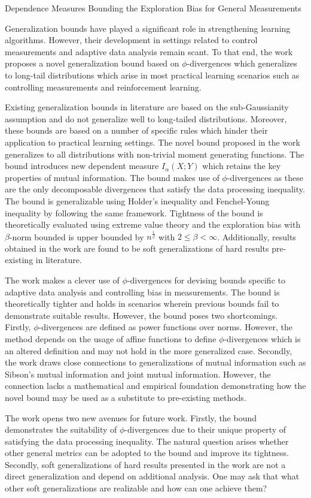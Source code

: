 \documentclass[12pt,letterpaper]{article}
\begin{document}
\begin{center}
  \large{Dependence Measures Bounding the Exploration
  Bias for General Measurements}
\end{center}

Generalization bounds have played a significant role in strengthening learning algorithms. However, their development in settings related to control measurements and adaptive data analysis remain scant. To that end, the work proposes a novel generalization bound based on $\phi$-divergences which generalizes to long-tail distributions which arise in most practical learning scenarios such as controlling measurements and reinforcement learning. 

Existing generalization bounds in literature are based on the sub-Gaussianity assumption and do not generalize well to long-tailed distributions. Moreover, these bounds are based on a number of specific rules which hinder their application to practical learning settings. The novel bound proposed in the work generalizes to all distributions with non-trivial moment generating functions. The bound introduces new dependent measure $I_{\alpha}(X;Y)$ which retains the key properties of mutual information. The bound makes use of $\phi$-divergences as these are the only decomposable divergences that satisfy the data processing inequality. The bound is generalizable using Holder's inequality and Fenchel-Young inequality by following the same framework. Tightness of the bound is theoretically evaluated using extreme value theory and the exploration bias with $\beta$-norm bounded is upper bounded by $n^{\frac{1}{\beta}}$ with $2 \leq\beta<\infty$. Additionally, results obtained in the work are found to be soft generalizations of hard results pre-existing in literature. 

The work makes a clever use of $\phi$-divergences for devising bounds specific to adaptive data analysis and controlling bias in measurements. The bound is theoretically tighter and holds in scenarios wherein previous bounds fail to demonstrate suitable results. However, the bound poses two shortcomings. Firstly, $\phi$-divergences are defined as power functions over norms. However, the method depends on the usage of affine functions to define $\phi$-divergences which is an altered definition and may not hold in the more generalized case. Secondly, the work draws close connections to generalizations of mutual information such as Sibson's mutual information and joint mutual information. However, the connection lacks a mathematical and empirical foundation demonstrating how the novel bound may be used as a substitute to pre-existing methods.

The work opens two new avenues for future work. Firstly, the bound demonstrates the suitability of $\phi$-divergences due to their unique property of satisfying the data processing inequality. The natural question arises whether other general metrics can be adopted to the bound and improve its tightness. Secondly, soft generalizations of hard results presented in the work are not a direct generalization and depend on additional analysis. One may ask that what other soft generalizations are realizable and how can one achieve them?
\end{document}
